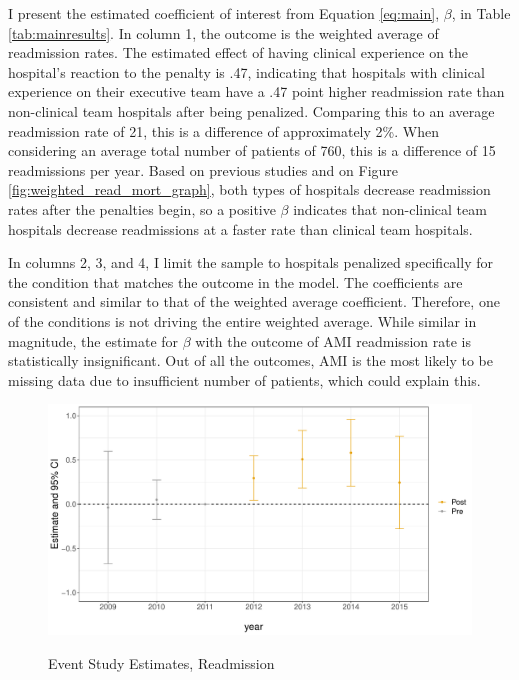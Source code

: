 \documentclass[12pt]{article}
\begin{document}
    I present the estimated coefficient of interest from Equation \ref{eq:main}, $\beta$, in Table \ref{tab:mainresults}. In column 1, the outcome is the weighted average of readmission rates. The estimated effect of having clinical experience on the hospital's reaction to the penalty is .47, indicating that hospitals with clinical experience on their executive team have a .47 point higher readmission rate than non-clinical team hospitals after being penalized. Comparing this to an average readmission rate of 21, this is a difference of approximately 2\%. When considering an average total number of patients of 760, this is a difference of 15 readmissions per year. Based on previous studies and on Figure \ref{fig:weighted_read_mort_graph}, both types of hospitals decrease readmission rates after the penalties begin, so a positive $\beta$ indicates that non-clinical team hospitals decrease readmissions at a faster rate than clinical team hospitals. 
    
    In columns 2, 3, and 4, I limit the sample to hospitals penalized specifically for the condition that matches the outcome in the model. The coefficients are consistent and similar to that of the weighted average coefficient. Therefore, one of the conditions is not driving the entire weighted average. While similar in magnitude, the estimate for $\beta$ with the outcome of AMI readmission rate is statistically insignificant. Out of all the outcomes, AMI is the most likely to be missing data due to insufficient number of patients, which could explain this. 

    \begin{figure}[ht!]
        \caption{Event Study Estimates, Readmission}
        \includegraphics[scale=.5]{Objects/read_es_graph.pdf}
        \label{fig:wa_eventstudy}
    \end{figure}
\end{document}
